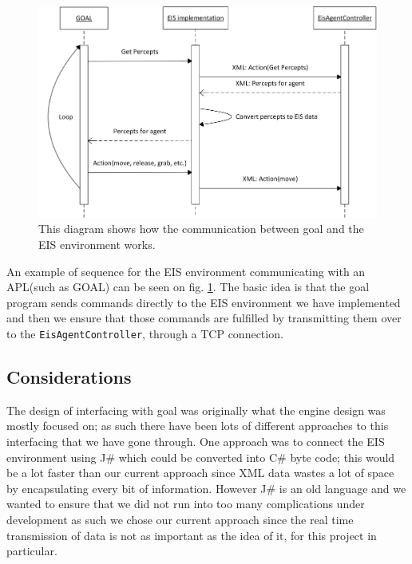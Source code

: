 \begin{figure}
\begin{centering}
\includegraphics[width=1\textwidth]{EISEnvironmentToGoalSequenceDiagram}
\par\end{centering}

\caption{This diagram shows how the communication between goal and the EIS
environment works.\label{fig:EISEnvironmentToGoalSequenceDiagram}}


\end{figure}


An example of sequence for the EIS environment communicating with
an APL(such as GOAL) can be seen on fig. \ref{fig:EISEnvironmentToGoalSequenceDiagram}.
The basic idea is that the goal program sends commands directly to
the EIS environment we have implemented and then we ensure that those
commands are fulfilled by transmitting them over to the \texttt{EisAgentController},
through a TCP connection.


\subsection*{Considerations}

The design of interfacing with goal was originally what the engine
design was mostly focused on; as such there have been lots of different
approaches to this interfacing that we have gone through. One approach
was to connect the EIS environment using J\# which could be converted
into C\# byte code; this would be a lot faster than our current approach
since XML data wastes a lot of space by encapsulating every bit of
information. However J\# is an old language and we wanted to ensure
that we did not run into too many complications under development
as such we chose our current approach since the real time transmission
of data is not as important as the idea of it, for this project in
particular. 


